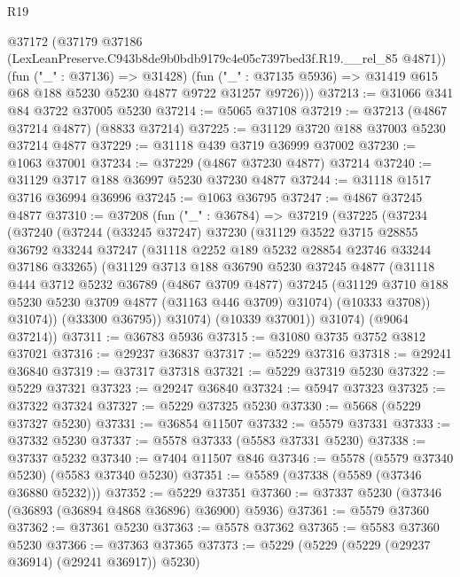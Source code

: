 \begin{lexlean}{R19}
\begin{coremodule}
      @37172
        (@37179 @37186 (LexLeanPreserve.C943b8de9b0bdb9179c4e05c7397bed3f.R19.__rel_85 @4871))
        (fun ("_" : @37136) => @31428)
        (fun ("_" : @37135 @5936) => @31419 @615 @68 @188 @5230 @5230 @4877 @9722 @31257 @9726)))
@37213 := @31066 @341 @84 @3722 @37005 @5230
@37214 := @5065 @37108
@37219 := @37213 (@4867 @37214 @4877) (@8833 @37214)
@37225 := @31129 @3720 @188 @37003 @5230 @37214 @4877
@37229 := @31118 @439 @3719 @36999 @37002
@37230 := @1063 @37001
@37234 := @37229 (@4867 @37230 @4877) @37214
@37240 := @31129 @3717 @188 @36997 @5230 @37230 @4877
@37244 := @31118 @1517 @3716 @36994 @36996
@37245 := @1063 @36795
@37247 := @4867 @37245 @4877
@37310 := @37208
    (fun ("_" : @36784) =>
    @37219
      (@37225
        (@37234
          (@37240
            (@37244
              (@33245 @37247)
              @37230
              (@31129
                @3522
                @3715
                @28855
                @36792
                @33244
                @37247
                (@31118 @2252 @189 @5232 @28854 @23746 @33244 @37186 @33265)
                (@31129
                  @3713
                  @188
                  @36790
                  @5230
                  @37245
                  @4877
                  (@31118
                    @444
                    @3712
                    @5232
                    @36789
                    (@4867 @3709 @4877)
                    @37245
                    (@31129 @3710 @188 @5230 @5230 @3709 @4877 (@31163 @446 @3709) @31074)
                    (@10333 @3708))
                  @31074))
              (@33300 @36795))
            @31074)
          (@10339 @37001))
        @31074)
      (@9064 @37214))
@37311 := @36783 @5936
@37315 := @31080 @3735 @3752 @3812 @37021
@37316 := @29237 @36837
@37317 := @5229 @37316
@37318 := @29241 @36840
@37319 := @37317 @37318
@37321 := @5229 @37319 @5230
@37322 := @5229 @37321
@37323 := @29247 @36840
@37324 := @5947 @37323
@37325 := @37322 @37324
@37327 := @5229 @37325 @5230
@37330 := @5668 (@5229 @37327 @5230)
@37331 := @36854 @11507
@37332 := @5579 @37331
@37333 := @37332 @5230
@37337 := @5578 @37333 (@5583 @37331 @5230)
@37338 := @37337 @5232
@37340 := @7404 @11507 @846
@37346 := @5578 (@5579 @37340 @5230) (@5583 @37340 @5230)
@37351 := @5589 (@37338 (@5589 (@37346 @36880 @5232)))
@37352 := @5229 @37351
@37360 := @37337 @5230 (@37346 (@36893 (@36894 @4868 @36896) @36900) @5936)
@37361 := @5579 @37360
@37362 := @37361 @5230
@37363 := @5578 @37362
@37365 := @5583 @37360 @5230
@37366 := @37363 @37365
@37373 := @5229 (@5229 (@5229 (@29237 @36914) (@29241 @36917)) @5230)

\end{coremodule}
\end{lexlean}
